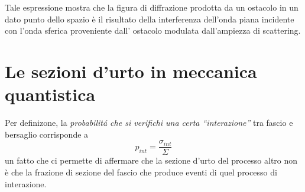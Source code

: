 Tale espressione mostra che la figura di diffrazione prodotta da un ostacolo in un dato punto dello spazio è il
risultato della interferenza dell'onda piana incidente con l'onda sferica proveniente dall' ostacolo modulata
dall'ampiezza di scattering.
\section{Le sezioni d'urto in meccanica quantistica}\label{sec:le-sezioni-d'urto-in-meccanica-quantistica}
Per definizone, la \emph{probabilitá che si verifichi una certa ``interazione''} tra fascio e bersaglio corrisponde a
\[
	 p_{int} = \frac{\sigma_{int}}{\Sigma}
\]
un fatto che ci permette di affermare che la sezione d'urto del
processo altro non è che la frazione di sezione del fascio che produce
eventi di quel processo di interazione.

